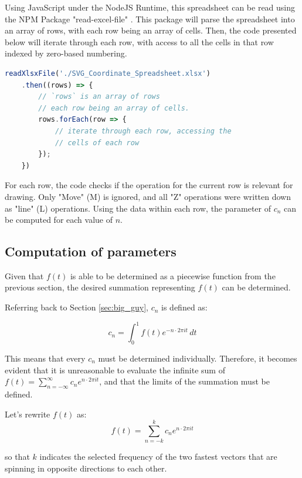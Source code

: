 \documentclass[letterpaper, 12pt]{article}
\begin{document}
Using JavaScript under the NodeJS Runtime, this spreadsheet can
be read using the NPM Package "read-excel-file" \cite{kuchumovReadexcelfile}.
This package will parse the spreadsheet into an array of rows,
with each row being an array of cells. Then, the code presented
below will iterate through each row, with access to all the cells
in that row indexed by zero-based numbering.

\begin{lstlisting}[language=JavaScript]
    readXlsxFile('./SVG_Coordinate_Spreadsheet.xlsx')
    .then((rows) => {
        // `rows` is an array of rows
        // each row being an array of cells.
        rows.forEach(row => {
            // iterate through each row, accessing the
            // cells of each row
        });
    })
\end{lstlisting}

For each row, the code checks if the operation for the current
row is relevant for drawing. Only "Move" (M) is ignored, and
all "Z" operations were written down as "line" (L) operations.
Using the data within each row, the parameter of \(c_n\) can be
computed for each value of \(n\).

\subsection{Computation of parameters}

Given that \(f(t)\) is able to be determined as a piecewise function
from the previous section, the desired summation representing
\(f(t)\) can be determined.

Referring back to Section \ref*{sec:big_guy}, \(c_n\) is defined as:

\begin{equation*}
    c_n = \int_{0}^{1} f(t) e^{-n \cdot 2\pi it} \,dt
\end{equation*}

This means that every \(c_n\) must be determined individually. Therefore,
it becomes evident that it is unreasonable to evaluate the infinite sum of
\(f(t) = \sum_{n=-\infty}^{\infty} c_n e^{n \cdot 2\pi it}\), and that
the limits of the summation must be defined.

Let's rewrite \(f(t)\) as:
\begin{equation*}
    f(t) = \sum_{n=-k}^{k} c_n e^{n \cdot 2\pi it}
\end{equation*}

so that \(k\) indicates the selected frequency of the two fastest vectors
that are spinning in opposite directions to each other.
\end{document}
